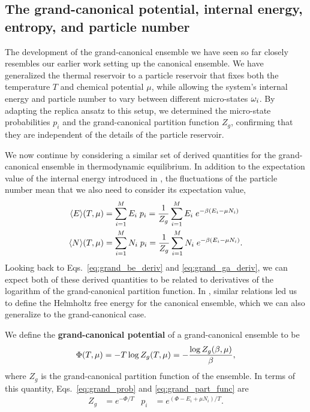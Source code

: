 \subsection{\label{sec:grand_pot}The grand-canonical potential, internal energy, entropy, and particle number}
The development of the grand-canonical ensemble we have seen so far closely resembles our earlier work setting up the canonical ensemble.
We have generalized the thermal reservoir to a particle reservoir that fixes both the temperature $T$ and chemical potential $\mu$, while allowing the system's internal energy and particle number to vary between different micro-states $\omega_i$.
By adapting the replica ansatz to this setup, we determined the micro-state probabilities $p_i$ and the grand-canonical partition function $Z_g$, confirming that they are independent of the details of the particle reservoir.

We now continue by considering a similar set of derived quantities for the grand-canonical ensemble in thermodynamic equilibrium.
In addition to the expectation value of the internal energy introduced in , the fluctuations of the particle number mean that we also need to consider its expectation value,
\begin{align*}
  \left\langle E \right\rangle\!(T, \mu) & = \sum_{i = 1}^M E_i \; p_i = \frac{1}{Z_g} \sum_{i = 1}^M E_i \; e^{-\beta (E_i - \mu N_i)} \\
  \left\langle N \right\rangle\!(T, \mu) & = \sum_{i = 1}^M N_i \; p_i = \frac{1}{Z_g} \sum_{i = 1}^M N_i \; e^{-\beta (E_i - \mu N_i)}.
\end{align*}
Looking back to Eqs.~\ref{eq:grand_be_deriv} and \ref{eq:grand_ga_deriv}, we can expect both of these derived quantities to be related to derivatives of the logarithm of the grand-canonical partition function.
In , similar relations led us to define the Helmholtz free energy for the canonical ensemble, which we can also generalize to the grand-canonical case.

\begin{shaded}
  We define the \textbf{grand-canonical potential} of a grand-canonical ensemble to be
  \begin{equation}
    \label{eq:grand_pot}
    \Phi(T, \mu) = -T \log Z_g(T, \mu) = -\frac{\log Z_g(\beta, \mu)}{\beta},
  \end{equation}
  where $Z_g$ is the grand-canonical partition function of the ensemble.
  In terms of this quantity, Eqs.~\ref{eq:grand_prob} and \ref{eq:grand_part_func} are
  \begin{align*}
    Z_g & = e^{-\Phi / T} &
    p_i & = e^{(\Phi - E_i + \mu N_i) / T}.
  \end{align*}
\end{shaded}

